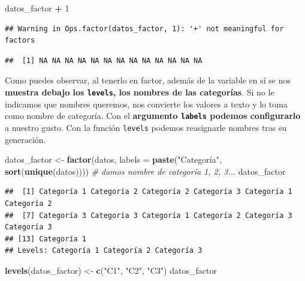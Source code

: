 \documentclass[11pt,]{book}
\newenvironment{Shaded}{\begin{snugshade}}{\end{snugshade}}
\newcommand{\CommentTok}[1]{\textcolor[rgb]{0.37,0.37,0.37}{\textit{#1}}}
\newcommand{\DataTypeTok}[1]{\textcolor[rgb]{0.27,0.27,0.27}{#1}}
\newcommand{\DecValTok}[1]{\textcolor[rgb]{0.06,0.06,0.06}{#1}}
\newcommand{\KeywordTok}[1]{\textcolor[rgb]{0.27,0.27,0.27}{\textbf{#1}}}
\newcommand{\NormalTok}[1]{#1}
\newcommand{\OperatorTok}[1]{\textcolor[rgb]{0.43,0.43,0.43}{\textbf{#1}}}
\newcommand{\StringTok}[1]{\textcolor[rgb]{0.5,0.5,0.5}{#1}}
\begin{document}
\begin{Shaded}
\begin{Highlighting}[]
\NormalTok{datos_factor }\OperatorTok{+}\StringTok{ }\DecValTok{1}
\end{Highlighting}
\end{Shaded}

\begin{verbatim}
## Warning in Ops.factor(datos_factor, 1): '+' not meaningful for factors
\end{verbatim}

\begin{verbatim}
##  [1] NA NA NA NA NA NA NA NA NA NA NA NA NA
\end{verbatim}

Como puedes observar, al tenerlo en factor, además de la variable en sí se nos \textbf{muestra debajo los \texttt{levels}, los nombres de las categorías}. Si no le indicamos que nombres queremos, nos convierte los valores a texto y lo toma como nombre de categoría. Con el \textbf{argumento \texttt{labels} podemos configurarlo} a nuestro gusto. Con la función \texttt{levels} podemos reasignarle nombres tras su generación.

\begin{Shaded}
\begin{Highlighting}[]
\NormalTok{datos_factor <-}\StringTok{ }\KeywordTok{factor}\NormalTok{(datos, }\DataTypeTok{labels =} \KeywordTok{paste}\NormalTok{(}\StringTok{"Categoría"}\NormalTok{, }\KeywordTok{sort}\NormalTok{(}\KeywordTok{unique}\NormalTok{(datos)))) }\CommentTok{# damos nombre de categoría 1, 2, 3...}
\NormalTok{datos_factor }
\end{Highlighting}
\end{Shaded}

\begin{verbatim}
##  [1] Categoría 1 Categoría 2 Categoría 2 Categoría 3 Categoría 1 Categoría 2
##  [7] Categoría 3 Categoría 3 Categoría 1 Categoría 2 Categoría 3 Categoría 3
## [13] Categoría 1
## Levels: Categoría 1 Categoría 2 Categoría 3
\end{verbatim}

\begin{Shaded}
\begin{Highlighting}[]
\KeywordTok{levels}\NormalTok{(datos_factor) <-}\StringTok{ }\KeywordTok{c}\NormalTok{(}\StringTok{"C1"}\NormalTok{, }\StringTok{"C2"}\NormalTok{, }\StringTok{"C3"}\NormalTok{)}
\NormalTok{datos_factor}
\end{Highlighting}
\end{Shaded}
\end{document}
